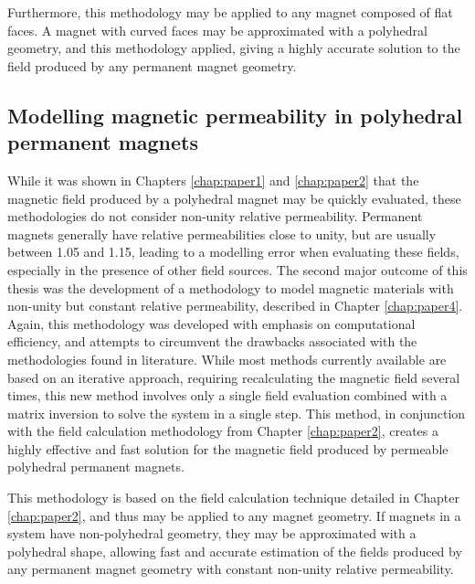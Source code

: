 Furthermore, this methodology may be applied to any magnet composed of flat faces. A magnet with curved faces may be approximated with a polyhedral geometry, and this methodology applied, giving a highly accurate solution to the field produced by any permanent magnet geometry.

\subsection{Modelling magnetic permeability in polyhedral permanent magnets}
While it was shown in Chapters \ref{chap:paper1} and \ref{chap:paper2} that the magnetic field produced by a polyhedral magnet may be quickly evaluated, these methodologies do not consider non-unity relative permeability. Permanent magnets generally have relative permeabilities close to unity, but are usually between 1.05 and 1.15, leading to a modelling error when evaluating these fields, especially in the presence of other field sources. The second major outcome of this thesis was the development of a methodology to model magnetic materials with non-unity but constant relative permeability, described in Chapter \ref{chap:paper4}. Again, this methodology was developed with emphasis on computational efficiency, and attempts to circumvent the drawbacks associated with the methodologies found in literature. While most methods currently available are based on an iterative approach, requiring recalculating the magnetic field several times, this new method involves only a single field evaluation combined with a matrix inversion to solve the system in a single step. This method, in conjunction with the field calculation methodology from Chapter \ref{chap:paper2}, creates a highly effective and fast solution for the magnetic field produced by permeable polyhedral permanent magnets.

This methodology is based on the field calculation technique detailed in Chapter \ref{chap:paper2}, and thus may be applied to any magnet geometry. If magnets in a system have non-polyhedral geometry, they may be approximated with a polyhedral shape, allowing fast and accurate estimation of the fields produced by any permanent magnet geometry with constant non-unity relative permeability.

